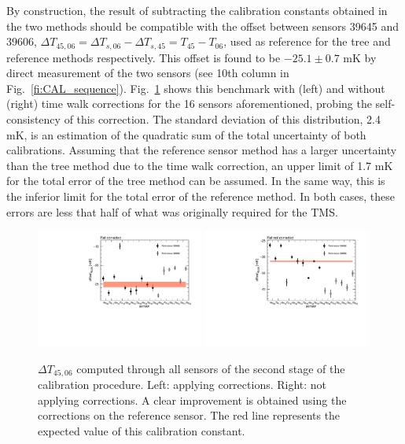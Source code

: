 By construction, the result of subtracting the calibration constants obtained in the two methods should be compatible with the offset between sensors 39645 and 39606, $\Delta T_{45,06} = \Delta T_{s,06}-\Delta T_{s,45} = T_{45}-T_{06}$, used as reference for the tree and reference methods respectively. This offset is found to be $-25.1 \pm 0.7$ mK by direct measurement of the two sensors (see 10th column in Fig.~\ref{fi:CAL_sequence}).  Fig.~\ref{fig:crosscheck} shows this benchmark with (left) and without (right) time walk corrections for the 16 sensors aforementioned, probing the self-consistency of this correction. The standard deviation of this distribution, 2.4 mK, is an estimation of the quadratic sum of the total uncertainty of both calibrations. Assuming that the reference sensor method has a larger uncertainty than the tree method due to the time walk correction, an upper limit of 1.7 mK for the total error of the tree method can be assumed. In the same way, this is the inferior limit for the total error of the reference method. In both cases, these errors are less that half of what was originally required for the TMS.

\begin{figure}[htbp]
\centering
{\includegraphics[width=0.49\textwidth]{images/figure_14_a.pdf}}
{\includegraphics[width=0.49\textwidth]{images/figure_14_b.pdf}}
\caption{$\Delta T_{45,06}$ computed through all sensors of the second stage of the calibration procedure. Left: applying corrections. Right: not applying corrections. A clear improvement is obtained using the corrections on the reference sensor. The red line represents the expected value of this calibration constant.}
\label{fig:crosscheck}
\end{figure}